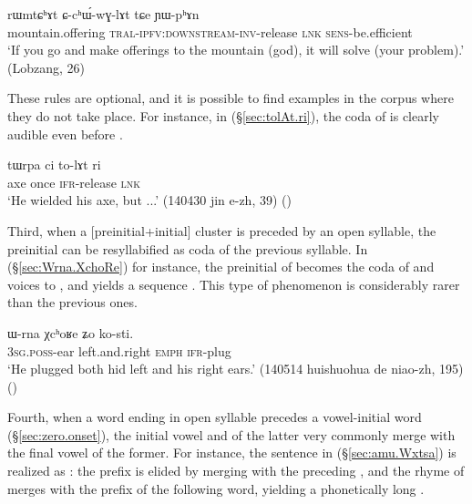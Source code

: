 \begin{exe}
	\ex \label{sec:rWmtChAt.cthWwGlAt}
	\gll  rɯmtɕʰɤt ɕ-cʰɯ́-wɣ-lɤt tɕe ɲɯ-pʰɤn  \\
	mountain.offering \textsc{tral}-\textsc{ipfv}:\textsc{downstream}-\textsc{inv}-release \textsc{lnk} \textsc{sens}-be.efficient   \\
	\glt `If you go and make offerings to the mountain (god), it will solve (your problem).'  (Lobzang, 26)
\end{exe}

These rules are optional, and it is possible to find examples in the corpus where they do not take place. For instance, in (§\ref{sec:tolAt.ri}), the coda  of  is clearly audible even before .

\begin{exe}
	\ex \label{sec:tolAt.ri}
	\gll tɯrpa ci to-lɤt ri \\
	axe once \textsc{ifr}-release \textsc{lnk} \\
	\glt `He wielded his axe, but ...' (140430 jin e-zh, 39)
	()
\end{exe}

Third, when a [preinitial+initial] cluster is preceded by an open syllable, the preinitial can be resyllabified as coda of the previous syllable. In (§\ref{sec:Wrna.XchoRe}) for instance, the preinitial  of  becomes the coda of  and voices to , and yields a sequence . This type of phenomenon is considerably rarer than the previous ones.

\begin{exe}
	\ex \label{sec:Wrna.XchoRe}
	\gll ɯ-rna χcʰoʁe ʑo ko-sti. \\
	\textsc{3sg}.\textsc{poss}-ear left.and.right \textsc{emph} \textsc{ifr}-plug \\
	\glt  `He plugged both hid left and his right ears.' (140514 huishuohua de niao-zh, 195)
	()
\end{exe}

Fourth, when a word ending in open syllable precedes a vowel-initial word (§\ref{sec:zero.onset}), the initial vowel  and  of the latter very commonly merge with the final vowel of the former. For instance, the sentence in (§\ref{sec:amu.Wxtsa}) is realized as : the  prefix is elided by merging with the preceding , and the  rhyme of  merges with the  prefix of the following word, yielding a phonetically long .


